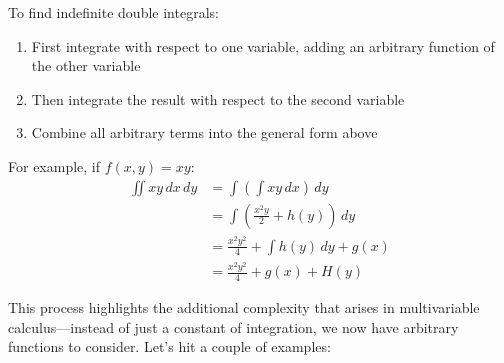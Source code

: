 \noindent To find indefinite double integrals:
\begin{enumerate}
   \item First integrate with respect to one variable, adding an arbitrary function of the other variable
   \item Then integrate the result with respect to the second variable
   \item Combine all arbitrary terms into the general form above
\end{enumerate}

\noindent For example, if $f(x,y) = xy$:
\begin{align*}
\iint xy \,dx\,dy &= \int\left(\int xy \,dx\right)\,dy \\
&= \int\left(\frac{x^2y}{2} + h(y)\right)\,dy \\
&= \frac{x^2y^2}{4} + \int h(y)\,dy + g(x) \\
&= \frac{x^2y^2}{4} + g(x) + H(y)
\end{align*}

\noindent This process highlights the additional complexity that arises in multivariable calculus—instead of just a constant of integration, we now have arbitrary functions to consider. Let's hit a couple of examples:

